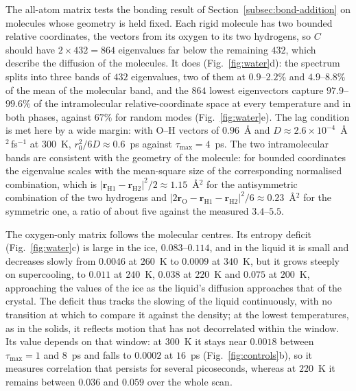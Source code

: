 The all-atom matrix tests the bonding result of Section~\ref{subsec:bond-addition} on molecules whose geometry is held fixed.
Each rigid molecule has two bounded relative coordinates, the vectors from its oxygen to its two hydrogens, so $C$ should have $2 \times 432 = 864$ eigenvalues far below the remaining $432$, which describe the diffusion of the molecules.
It does (Fig.~\ref{fig:water}d): the spectrum splits into three bands of $432$ eigenvalues, two of them at $0.9$--$2.2\%$ and $4.9$--$8.8\%$ of the mean of the molecular band, and the $864$ lowest eigenvectors capture $97.9$--$99.6\%$ of the intramolecular relative-coordinate space at every temperature and in both phases, against $67\%$ for random modes (Fig.~\ref{fig:water}e).
The lag condition is met here by a wide margin: with O--H vectors of $0.96$~\AA{} and $D \approx 2.6 \times 10^{-4}$~\AA$^{2}$\,fs$^{-1}$ at $300$~K, $r_{0}^{2}/6D \approx 0.6$~ps against $\tau_{\max} = 4$~ps.
The two intramolecular bands are consistent with the geometry of the molecule: for bounded coordinates the eigenvalue scales with the mean-square size of the corresponding normalised combination, which is $|\mathbf{r}_{\mathrm{H}1} - \mathbf{r}_{\mathrm{H}2}|^{2}/2 \approx 1.15$~\AA$^{2}$ for the antisymmetric combination of the two hydrogens and $|2\mathbf{r}_{\mathrm{O}} - \mathbf{r}_{\mathrm{H}1} - \mathbf{r}_{\mathrm{H}2}|^{2}/6 \approx 0.23$~\AA$^{2}$ for the symmetric one, a ratio of about five against the measured $3.4$--$5.5$.

The oxygen-only matrix follows the molecular centres.
Its entropy deficit (Fig.~\ref{fig:water}c) is large in the ice, $0.083$--$0.114$, and in the liquid it is small and decreases slowly from $0.0046$ at $260$~K to $0.0009$ at $340$~K, but it grows steeply on supercooling, to $0.011$ at $240$~K, $0.038$ at $220$~K and $0.075$ at $200$~K, approaching the values of the ice as the liquid's diffusion approaches that of the crystal.
The deficit thus tracks the slowing of the liquid continuously, with no transition at which to compare it against the density; at the lowest temperatures, as in the solids, it reflects motion that has not decorrelated within the window.
Its value depends on that window: at $300$~K it stays near $0.0018$ between $\tau_{\max} = 1$ and $8$~ps and falls to $0.0002$ at $16$~ps (Fig.~\ref{fig:controls}b), so it measures correlation that persists for several picoseconds, whereas at $220$~K it remains between $0.036$ and $0.059$ over the whole scan.

